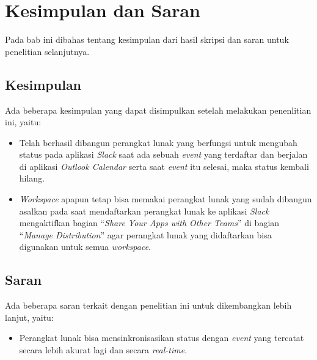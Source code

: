 \chapter{Kesimpulan dan Saran}
\label{chap:kesimpulan dan saran}

Pada bab ini dibahas tentang kesimpulan dari hasil skripsi dan saran untuk penelitian selanjutnya. 

\section{Kesimpulan}
Ada beberapa kesimpulan yang dapat disimpulkan setelah melakukan penenlitian ini, yaitu:
\begin{itemize}
    \item Telah berhasil dibangun perangkat lunak yang berfungsi untuk mengubah status pada aplikasi \textit{Slack} saat ada sebuah \textit{event} yang terdaftar dan berjalan di aplikasi \textit{Outlook Calendar} serta saat \textit{event} itu selesai, maka status kembali hilang. 
    \item \textit{Workspace} apapun tetap bisa memakai perangkat lunak yang sudah dibangun asalkan pada saat mendaftarkan perangkat lunak ke aplikasi \textit{Slack} mengaktifkan bagian ``\textit{Share Your Apps with Other Teams}'' di bagian ``\textit{Manage Distribution}'' agar perangkat lunak yang didaftarkan bisa digunakan untuk semua \textit{workspace}. 
\end{itemize}
\section{Saran}
Ada beberapa saran terkait dengan penelitian ini untuk dikembangkan lebih lanjut, yaitu:
\begin{itemize}
    \item Perangkat lunak bisa mensinkronisasikan status dengan \textit{event} yang tercatat secara lebih akurat lagi dan secara \textit{real-time}. 
\end{itemize}